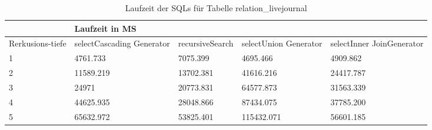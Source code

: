 \begin{table}[H]
	\begin{tabular}{l|l|l|l|l|l|}
		\cline{2-6}
		& \multicolumn{5}{|l|}{Laufzeit in MS}                                                                                                                                                  \\ \hline
		\multicolumn{1}{|l|}{\multirow{2}{2cm}{Rerkusions-tiefe}} & \multicolumn{2}{|l|}{\multirow{2}{3cm}{selectCascading Generator}} & \multirow{2}{2.8cm}{recursiveSearch} & \multirow{2}{2.5cm}{selectUnion Generator} & \multirow{2}{2.5cm}{selectInner JoinGenerator} \\
		\multicolumn{1}{|l|}{}
		& \multicolumn{2}{|l|}{}                                           &                                  &                                     &                                           \\ \hline
		\multicolumn{1}{|l|}{1}                                 & \multicolumn{2}{l|}{4761.733}                                    & 7075.399                                              & 4695.466                                                  & 4909.862                                                        \\ \hline
		\multicolumn{1}{|l|}{2}                                 & \multicolumn{2}{l|}{11589.219}                                   & 13702.381                                             & 41616.216                                                 & 24417.787                                                       \\ \hline
		\multicolumn{1}{|l|}{3}                                 & \multicolumn{2}{l|}{24971}                                       & 20773.831                                             & 64577.873                                                 & 31563.339                                                       \\ \hline
		\multicolumn{1}{|l|}{4}                                 & \multicolumn{2}{l|}{44625.935}                                   & 28048.866                                             & 87434.075                                                 & 37785.200                                                       \\ \hline
		\multicolumn{1}{|l|}{5}                                 & \multicolumn{2}{l|}{65632.972}                                   & 53825.401                                             & 115432.071                                                & 56601.185                                                       \\ \hline
		
	\end{tabular}
	\caption{Laufzeit der SQLs für Tabelle relation\_livejournal}
\end{table}

